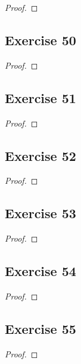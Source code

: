 \documentclass[14pt]{extarticle}
\begin{document}
\begin{proof}

\end{proof}

\subsection{Exercise 50}

\begin{proof}

\end{proof}

\subsection{Exercise 51}

\begin{proof}

\end{proof}

\subsection{Exercise 52}

\begin{proof}

\end{proof}

\subsection{Exercise 53}

\begin{proof}

\end{proof}

\subsection{Exercise 54}

\begin{proof}

\end{proof}

\subsection{Exercise 55}

\begin{proof}

\end{proof}
\end{document}
